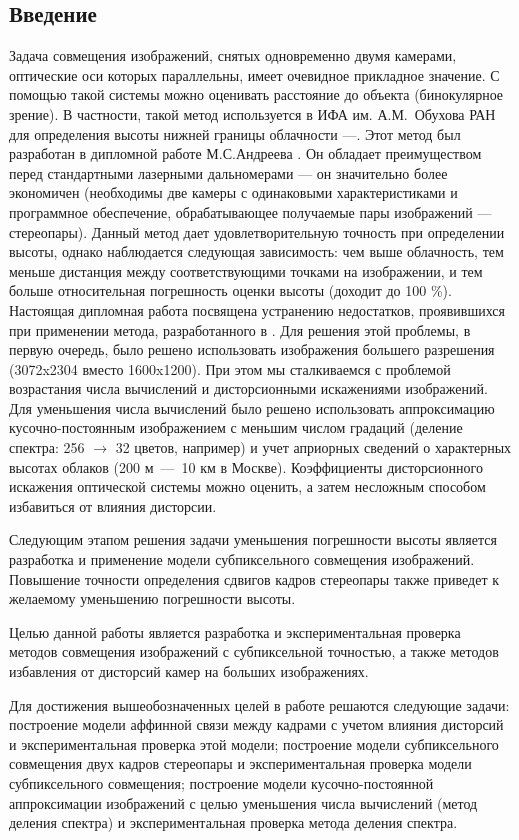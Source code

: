 \begin{center}
  \section*{Введение}
\end{center}

Задача совмещения изображений, снятых одновременно двумя камерами, оптические оси которых параллельны, имеет очевидное прикладное значение. С помощью такой системы можно оценивать расстояние до объекта (бинокулярное зрение). В частности, такой метод используется в ИФА им. А.М.~Обухова РАН для определения высоты нижней границы облачности \cite{art:refined}---\cite{art:estimation4}. Этот метод был разработан в дипломной работе М.С.Андреева \cite{book:andreev_diplom}.
 Он обладает преимуществом перед стандартными лазерными дальномерами --- он значительно более экономичен (необходимы две камеры с одинаковыми характеристиками и программное обеспечение, обрабатывающее получаемые пары изображений --- стереопары). Данный метод дает удовлетворительную точность при определении высоты, однако наблюдается следующая зависимость: чем выше облачность, тем меньше дистанция между соответствующими точками на изображении, и тем больше относительная погрешность оценки высоты (доходит до 100 \%). Настоящая дипломная работа посвящена устранению недостатков, проявившихся при применении метода, разработанного в \cite{book:andreev_diplom}.
 Для решения этой проблемы, в первую очередь, было решено использовать изображения большего разрешения (3072x2304 вместо 1600x1200). При этом мы сталкиваемся с проблемой возрастания числа вычислений и дисторсионными искажениями изображений. Для уменьшения числа вычислений было решено использовать аппроксимацию кусочно-постоянным изображением с меньшим числом градаций (деление спектра: 256 $\rightarrow$ 32 цветов, например) и учет априорных сведений о характерных высотах облаков (200 м~---~10 км в Москве). Коэффициенты дисторсионного искажения оптической системы можно оценить, а затем несложным способом избавиться от влияния дисторсии.

Следующим этапом решения задачи уменьшения погрешности высоты является разработка и применение модели субпиксельного совмещения изображений. Повышение точности определения сдвигов кадров стереопары также приведет к желаемому уменьшению погрешности высоты.

Целью данной работы является разработка и экспериментальная проверка методов совмещения изображений с субпиксельной точностью, а также методов избавления от дисторсий камер на больших изображениях.

Для достижения вышеобозначенных целей в работе решаются следующие задачи:
построение модели аффинной связи между кадрами с учетом влияния дисторсий и экспериментальная проверка этой модели;
построение модели субпиксельного совмещения двух кадров стереопары
и экспериментальная проверка модели субпиксельного совмещения;
построение модели кусочно-постоянной аппроксимации изображений с целью уменьшения числа вычислений (метод деления спектра)
и экспериментальная проверка метода деления спектра.

